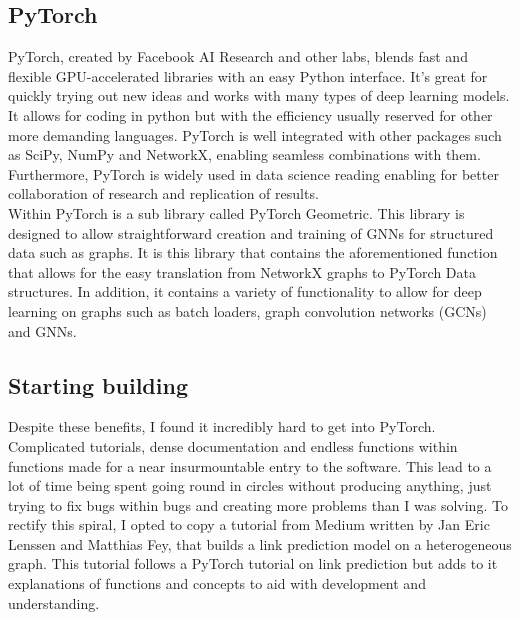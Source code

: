 \documentclass{l4proj}
\begin{document}
\subsection{PyTorch}

PyTorch, created by Facebook AI Research and other labs, blends fast and flexible GPU-accelerated libraries with an easy Python interface. It's great for quickly trying out new ideas and works with many types of deep learning models. It allows for coding in python but with the efficiency usually reserved for other more demanding languages. PyTorch is well integrated with other packages such as SciPy, NumPy and NetworkX, enabling seamless combinations with them. Furthermore, PyTorch is widely used in data science reading enabling for better collaboration of research and replication of results. \\

Within PyTorch is a sub library called PyTorch Geometric. This library is designed to allow straightforward creation and training of GNNs for structured data such as graphs. It is this library that contains the aforementioned function that allows for the easy translation from NetworkX graphs to PyTorch Data structures. In addition, it contains a variety of functionality to allow for deep learning on graphs such as batch loaders, graph convolution networks (GCNs) and GNNs. \\

\subsection{Starting building}

Despite these benefits, I found it incredibly hard to get into PyTorch. Complicated tutorials, dense documentation and endless functions within functions made for a near insurmountable entry to the software. This lead to a lot of time being spent going round in circles without producing anything, just trying to fix bugs within bugs and creating more problems than I was solving. To rectify this spiral, I opted to copy a tutorial from Medium written by Jan Eric Lenssen and Matthias Fey, that builds a link prediction model on a heterogeneous graph. This tutorial follows a PyTorch tutorial on link prediction but adds to it explanations of functions and concepts to aid with development and understanding. \\
\end{document}
